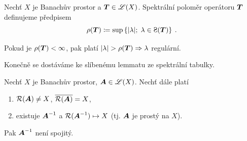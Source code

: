 \begin{definition}
Nechť $X$ je Banachův prostor a $\boldsymbol{T} \in \mathscr{L}(X)$. Spektrální poloměr operátoru $\boldsymbol{T}$ definujeme předpisem $$ \rho(\map T)\coloneqq \sup \left \lbrace |\lambda|;\; \lambda\in\Sp(\map T) \right \rbrace \:.$$
\end{definition}

 Pokud je $\rho(\boldsymbol{T}) <\infty$, pak platí $|\lambda|>\rho(\map T)\Rightarrow \lambda$ regulární.

Konečně se dostáváme ke slíbenému lemmatu ze spektrální tabulky.
\begin{lemma}
Nechť $X$ je Banachův prostor, $\boldsymbol{A} \in \mathscr{L} (X)$. Nechť dále platí \begin{enumerate}
    \item $\mathcal{R}(\boldsymbol{A})\neq X$, $\overline{\mathcal{R}(\boldsymbol{A})}=X$,
    \item existuje $\boldsymbol{A}^{-1}$ a $\mathcal{R}(\boldsymbol{A}^{-1}) \mapsto X$ (tj. $\boldsymbol{A}$ je prostý na $X$).
\end{enumerate}
Pak $\boldsymbol{A}^{-1}$ není spojitý.
\end{lemma}


